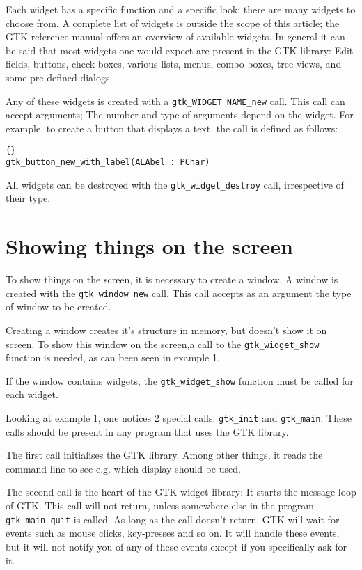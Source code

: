 \documentclass[10pt]{article}
\begin{document}
Each widget has a specific function and a specific look; there are many
widgets to choose from. A complete list of widgets is outside the scope of
this article; the GTK reference manual offers an overview of available
widgets. In general it can be said that most widgets one would expect
are present in the GTK library: Edit fields, buttons, check-boxes, various 
lists, menus, combo-boxes, tree views, and some pre-defined dialogs. 

Any of these widgets is created with a \lstinline|gtk_WIDGET NAME_new| call. 
This call can accept arguments; The number and type of arguments depend 
on the widget. 
For example, to create a button that displays a text, the call is defined 
as follows:
\begin{lstlisting}{}
gtk_button_new_with_label(ALAbel : PChar)
\end{lstlisting}
All widgets can be destroyed with the \lstinline|gtk_widget_destroy| call,
irrespective of their type.

\section{Showing things on the screen}
To show things on the screen, it is necessary to create a window. A window
is created with the \lstinline|gtk_window_new| call. This call accepts 
as an argument the type of window to be created. 

Creating a window creates it's structure in memory, but doesn't show it on 
screen. To show this window on the screen,a call to the 
\lstinline|gtk_widget_show| function is needed, as can been seen in
example 1.

If the window contains widgets, the \lstinline|gtk_widget_show| function
must be called for each widget. 

Looking at example 1, one notices 2 special calls: \lstinline|gtk_init| and
\lstinline|gtk_main|. These calls should be present in any program that uses
the GTK library.  

The first call initialises the GTK library. Among other things, it reads
the command-line to see e.g. which display should be used.

The second call is the heart of the GTK widget library: It starts the
message loop of GTK. This call will not return, unless somewhere else
in the program \lstinline|gtk_main_quit| is called. As long as the call
doesn't return, GTK will wait for events such as mouse clicks, key-presses
and so on. It will handle these events, but it will not notify you of any 
of these events except if you specifically ask for it. 
\end{document}
